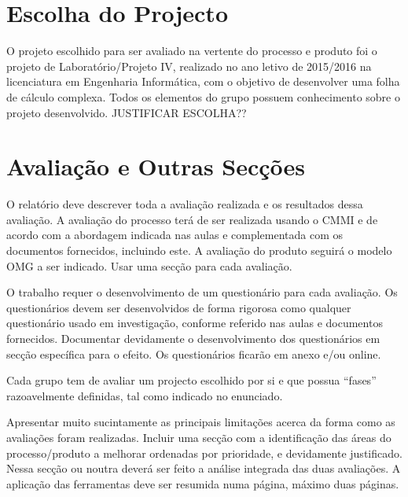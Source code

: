 \documentclass[openany,10pt,a4paper]{article}
\begin{document}
\section{Escolha do Projecto}
O projeto escolhido para ser avaliado na vertente do processo e produto foi o projeto de Laboratório/Projeto IV, realizado no ano letivo de 2015/2016 na licenciatura em Engenharia Informática, com o objetivo de desenvolver uma folha de cálculo complexa. Todos os elementos do grupo possuem conhecimento sobre o projeto desenvolvido. JUSTIFICAR ESCOLHA??


\section{Avaliação e Outras Secções}
O relatório deve descrever toda a avaliação realizada e os resultados dessa avaliação. A avaliação do processo terá de ser realizada usando o CMMI e de acordo com a abordagem indicada nas aulas e complementada com os documentos fornecidos, incluindo este. A avaliação do produto seguirá o modelo OMG a ser indicado. Usar uma secção para cada avaliação.

O trabalho requer o desenvolvimento de um questionário para cada avaliação. Os questionários devem ser desenvolvidos de forma rigorosa como qualquer questionário usado em investigação, conforme referido nas aulas e documentos fornecidos. Documentar devidamente o desenvolvimento dos questionários em secção específica para o efeito. Os questionários ficarão em anexo e/ou online.

Cada grupo tem de avaliar um projecto escolhido por si e que possua “fases” razoavelmente definidas, tal como indicado no enunciado.

Apresentar muito sucintamente as principais limitações acerca da forma como as avaliações foram realizadas. Incluir uma secção com a identificação das áreas do processo/produto a melhorar ordenadas por prioridade, e devidamente justificado. Nessa secção ou noutra deverá ser feito a análise integrada das duas avaliações. A aplicação das ferramentas deve ser resumida numa página, máximo duas páginas.
\end{document}
